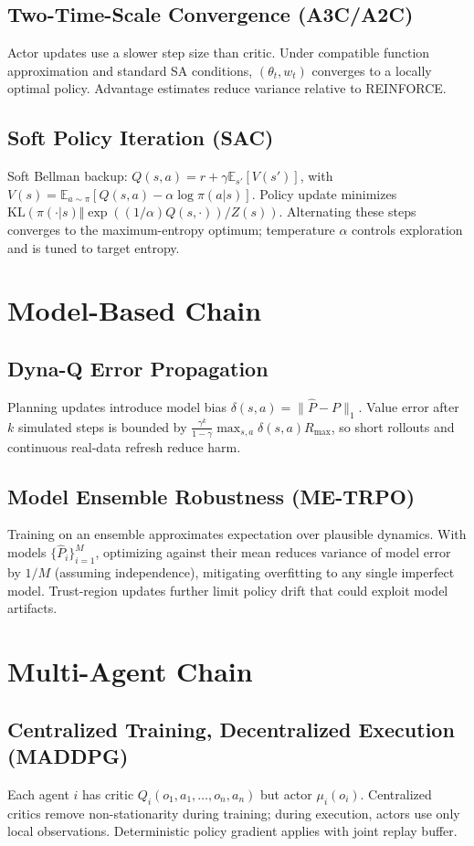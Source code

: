 \documentclass[11pt]{article}
\newcommand{\E}{\mathbb{E}}
\newcommand{\1}{\mathbf{1}}
\begin{document}
\subsection{Two-Time-Scale Convergence (A3C/A2C)}
Actor updates use a slower step size than critic. Under compatible function approximation and standard SA conditions, $(\theta_t, w_t)$ converges to a locally optimal policy. Advantage estimates reduce variance relative to REINFORCE.

\subsection{Soft Policy Iteration (SAC)}
Soft Bellman backup: $Q(s,a) = r + \gamma \E_{s'}[V(s')]$, with $V(s)=\E_{a\sim\pi}[Q(s,a)-\alpha \log \pi(a|s)]$. Policy update minimizes $\mathrm{KL}(\pi(\cdot|s) \Vert \exp((1/\alpha)Q(s,\cdot))/Z(s))$. Alternating these steps converges to the maximum-entropy optimum; temperature $\alpha$ controls exploration and is tuned to target entropy.

\section{Model-Based Chain}
\subsection{Dyna-Q Error Propagation}
Planning updates introduce model bias $\delta(s,a)=\|\hat{P}-P\|_1$. Value error after $k$ simulated steps is bounded by $\frac{\gamma^k}{1-\gamma}\max_{s,a}\delta(s,a) R_{\max}$, so short rollouts and continuous real-data refresh reduce harm.

\subsection{Model Ensemble Robustness (ME-TRPO)}
Training on an ensemble approximates expectation over plausible dynamics. With models $\{\hat{P}_i\}_{i=1}^M$, optimizing against their mean reduces variance of model error by $1/M$ (assuming independence), mitigating overfitting to any single imperfect model. Trust-region updates further limit policy drift that could exploit model artifacts.

\section{Multi-Agent Chain}
\subsection{Centralized Training, Decentralized Execution (MADDPG)}
Each agent $i$ has critic $Q_i(o_1,a_1,\dots,o_n,a_n)$ but actor $\mu_i(o_i)$. Centralized critics remove non-stationarity during training; during execution, actors use only local observations. Deterministic policy gradient applies with joint replay buffer.
\end{document}
